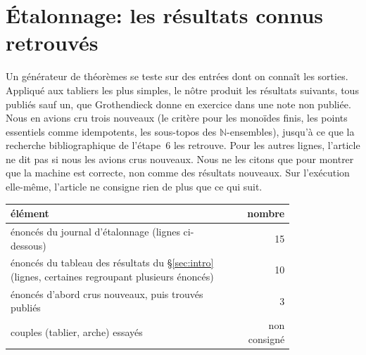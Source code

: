 \section{Étalonnage: les résultats connus retrouvés}\label{sec:calibration}

Un générateur de théorèmes se teste sur des entrées dont on connaît les sorties. Appliqué aux tabliers les plus simples, le nôtre produit les résultats suivants, tous publiés sauf un, que Grothendieck donne en exercice dans une note non publiée. Nous en avions cru trois nouveaux (le critère pour les monoïdes finis, les points essentiels comme idempotents, les sous-topos des $\mathbb N$-ensembles), jusqu'à ce que la recherche bibliographique de l'étape~6 les retrouve. Pour les autres lignes, l'article ne dit pas si nous les avions crus nouveaux. Nous ne les citons que pour montrer que la machine est correcte, non comme des résultats nouveaux. Sur l'exécution elle-même, l'article ne consigne rien de plus que ce qui suit.

\begin{center}\small
\begin{tabular}{@{}p{0.8\linewidth}r@{}}
\toprule
élément & nombre\\
\midrule
énoncés du journal d'étalonnage (lignes ci-dessous) & 15\\
énoncés du tableau des résultats du \S\ref{sec:intro} (lignes, certaines regroupant plusieurs énoncés) & 10\\
énoncés d'abord crus nouveaux, puis trouvés publiés & 3\\
couples (tablier, arche) essayés & non consigné\\
\bottomrule
\end{tabular}
\end{center}

